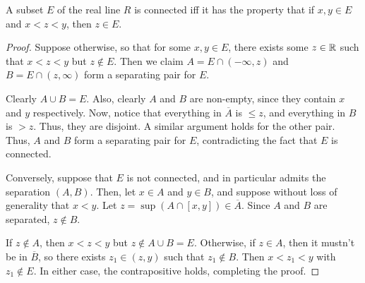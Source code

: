 \begin{theorem}
A subset $E$ of the real line $R$ is connected iff it has the property that if $x, y \in E$ and $x < z < y$, then $z \in E$. 

\begin{proof}
Suppose otherwise, so that for some $x, y \in E$, there exists some $z \in \mathbb{R}$ such that $x < z < y$ but $z \not\in E$. Then we claim $A = E \cap (-\infty, z)$ and $B = E \cap (z, \infty)$ form a separating pair for $E$. 

Clearly $A \cup B = E$. Also, clearly $A$ and $B$ are non-empty, since they contain $x$ and $y$ respectively. Now, notice that everything in $\overline{A}$ is $\le z$, and everything in $B$ is $> z$. Thus, they are disjoint. A similar argument holds for the other pair. Thus, $A$ and $B$ form a separating pair for $E$, contradicting the fact that $E$ is connected.

Conversely, suppose that $E$ is not connected, and in particular admits the separation $(A, B)$.  Then, let $x \in A$ and $y \in B$, and suppose without loss of generality that $x < y$. Let $z = \sup(A \cap [x, y]) \in \overline{A}$. Since $A$ and $B$ are separated, $z \not\in B$. 

If $z \not\in A$, then $x < z < y$ but $z \not\in A \cup B = E$. Otherwise, if $z \in A$, then it mustn't be in $\overline{B}$, so there exists $z_1 \in (z, y)$ such that $z_1 \not\in B$. Then $x < z_1 < y$ with $z_1 \not\in E$. In either case, the contrapositive holds, completing the proof.
\end{proof}
\end{theorem}


